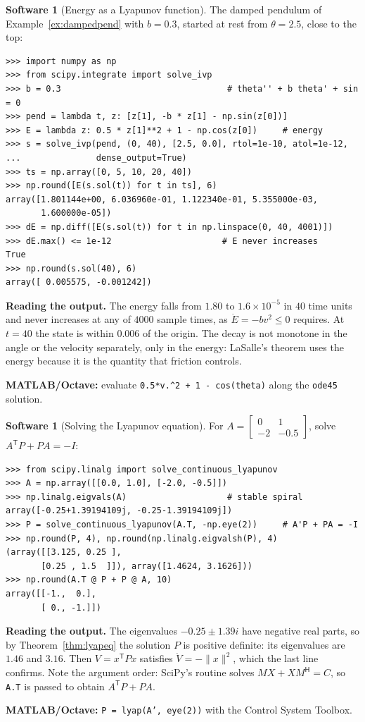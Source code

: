 \documentclass[11pt,a4paper]{article}
\numberwithin{equation}{section}
\theoremstyle{definition}
\newtheorem{software}[thm]{Software}
\begin{document}
\begin{software}[Energy as a Lyapunov function]
\label{sw:energy}
The damped pendulum of Example~\ref{ex:dampedpend} with $b = 0.3$, started at rest from $\theta = 2.5$, close to the top:
{\small\begin{verbatim}
>>> import numpy as np
>>> from scipy.integrate import solve_ivp
>>> b = 0.3                                 # theta'' + b theta' + sin = 0
>>> pend = lambda t, z: [z[1], -b * z[1] - np.sin(z[0])]
>>> E = lambda z: 0.5 * z[1]**2 + 1 - np.cos(z[0])     # energy
>>> s = solve_ivp(pend, (0, 40), [2.5, 0.0], rtol=1e-10, atol=1e-12,
...               dense_output=True)
>>> ts = np.array([0, 5, 10, 20, 40])
>>> np.round([E(s.sol(t)) for t in ts], 6)
array([1.801144e+00, 6.036960e-01, 1.122340e-01, 5.355000e-03,
       1.600000e-05])
>>> dE = np.diff([E(s.sol(t)) for t in np.linspace(0, 40, 4001)])
>>> dE.max() <= 1e-12                      # E never increases
True
>>> np.round(s.sol(40), 6)
array([ 0.005575, -0.001242])
\end{verbatim}}
\textbf{Reading the output.} The energy falls from $1.80$ to $1.6 \times 10^{-5}$ in $40$ time units and never increases at any of $4000$ sample times, as $\dot E = -bv^2 \leq 0$ requires. At $t = 40$ the state is within $0.006$ of
the origin. The decay is not monotone in the angle or the velocity separately, only in the energy: LaSalle's theorem uses the energy because it is the quantity that friction controls.

\textbf{MATLAB/Octave:} evaluate \texttt{0.5*v.\^{}2 + 1 - cos(theta)} along the \texttt{ode45} solution.
\end{software}

\begin{software}[Solving the Lyapunov equation]
\label{sw:lyapeq}
For $A = \begin{bmatrix} 0 & 1\\ -2 & -0.5\end{bmatrix}$, solve $A^{\mathsf T}P + PA = -I$:
{\small\begin{verbatim}
>>> from scipy.linalg import solve_continuous_lyapunov
>>> A = np.array([[0.0, 1.0], [-2.0, -0.5]])
>>> np.linalg.eigvals(A)                    # stable spiral
array([-0.25+1.39194109j, -0.25-1.39194109j])
>>> P = solve_continuous_lyapunov(A.T, -np.eye(2))     # A'P + PA = -I
>>> np.round(P, 4), np.round(np.linalg.eigvalsh(P), 4)
(array([[3.125, 0.25 ],
       [0.25 , 1.5  ]]), array([1.4624, 3.1626]))
>>> np.round(A.T @ P + P @ A, 10)
array([[-1.,  0.],
       [ 0., -1.]])
\end{verbatim}}
\textbf{Reading the output.} The eigenvalues $-0.25 \pm 1.39i$ have negative real parts, so by Theorem~\ref{thm:lyapeq} the solution $P$ is positive definite: its eigenvalues are $1.46$ and $3.16$. Then $V = x^{\mathsf T}Px$ satisfies
$\dot V = -\|x\|^2$, which the last line confirms. Note the argument order: SciPy's routine solves $MX + XM^{\mathsf H} = C$, so \texttt{A.T} is passed to obtain $A^{\mathsf T}P + PA$.

\textbf{MATLAB/Octave:} \texttt{P = lyap(A', eye(2))} with the Control System Toolbox.
\end{software}
\end{document}
